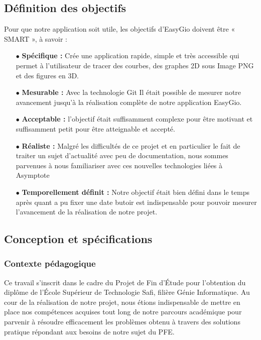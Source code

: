 \documentclass[a4paper]{report}
\begin{document}
\subsection{Définition des objectifs}
Pour que notre application soit utile, les objectifs d'EasyGio doivent être « SMART », à savoir :
\begin{itemize}
    \item[$\bullet$] \textbf{Spécifique : }Crée une application rapide, simple et très accessible qui permet à l'utilisateur de tracer des courbes, des graphes 2D sous Image PNG et des figures en 3D.
    \item[$\bullet$] \textbf{Mesurable : }Avec la technologie Git Il était possible de mesurer notre avancement jusqu'à la réalisation complète de notre application EasyGio.
    \item[$\bullet$] \textbf{Acceptable : }l’objectif était suffisamment complexe pour être motivant et suffisamment petit pour être atteignable et accepté.
    \item[$\bullet$] \textbf{Réaliste : }Malgré les difficultés de ce projet et en particulier le fait de traiter un sujet d’actualité avec peu de documentation, nous sommes parvenues à nous familiariser avec ces nouvelles technologies liées à Asymptote
    \item[$\bullet$] \textbf{Temporellement définit : }Notre objectif était bien défini dans le temps après quant a pu fixer une date butoir est indispensable pour pouvoir mesurer l’avancement de la réalisation de notre projet.
\end{itemize}
\subsection{Conception et spécifications}
\subsubsection{Contexte pédagogique}
Ce travail s'inscrit dans le cadre du Projet de Fin d'Étude pour l'obtention du diplôme de l'École Supérieur de Technologie Safi, filière Génie Informatique. Au cour de la réalisation de notre projet, nous étions indispensable de mettre en place nos compétences acquises tout long de notre parcours académique pour parvenir à résoudre efficacement les problèmes obtenu à travers des solutions pratique répondant aux besoins de notre sujet du PFE.
\end{document}
